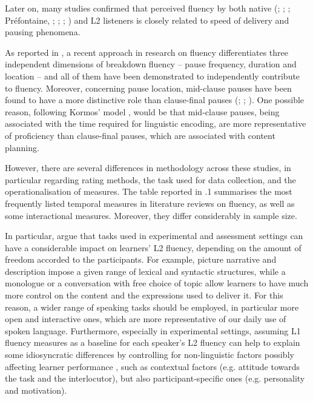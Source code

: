 Later on, many studies confirmed that perceived fluency by both native (\citealt{BoskerEtAl2013}; \citealt{DerwingEtAl2004}; \citealt{KormosDénes2004}; Préfontaine, \citealt{KormosJohnson2016}; \citealt{Rossiter2009}; \citealt{SaitoEtAl2018}; \citealt{SuzukiKormos2020}) and L2 listeners \citep{MagneEtAl2019} is closely related to speed of delivery and pausing phenomena.

As reported in \citet{SuzukiKormos2020}, a recent approach in research on fluency differentiates three independent dimensions of breakdown fluency – pause frequency, duration and location – and all of them have been demonstrated to independently contribute to fluency. Moreover, concerning pause location, mid-clause pauses have been found to have a more distinctive role than clause-final pauses (\citealt{MagneEtAl2019}; \citealt{SaitoEtAl2018}; \citealt{SuzukiKormos2020}). One possible reason, following Kormos’ model \citep{Kormos2006}, would be that mid-clause pauses, being associated with the time required for linguistic encoding, are more representative of proficiency than clause-final pauses, which are associated with content planning.

However, there are several differences in methodology across these studies, in particular regarding rating methods, the task used for data collection, and the operationalisation of measures. The table reported in .1 summarises the most frequently listed temporal measures in literature reviews on fluency, as well as some interactional measures. Moreover, they differ considerably in sample size.

In particular, \citet{DerwingEtAl2004} argue that tasks used in experimental and assessment settings can have a considerable impact on learners’ L2 fluency, depending on the amount of freedom accorded to the participants. For example, picture narrative and description impose a given range of lexical and syntactic structures, while a monologue or a conversation with free choice of topic allow learners to have much more control on the content and the expressions used to deliver it. For this reason, a wider range of speaking tasks should be employed, in particular more open and interactive ones, which are more representative of our daily use of spoken language. Furthermore, especially in experimental settings, assuming L1 fluency measures as a baseline for each speaker’s L2 fluency can help to explain some idiosyncratic differences by controlling for non-linguistic factors possibly affecting learner performance \citep{Segalowitz2016}, such as contextual factors (e.g. attitude towards the task and the interlocutor), but also participant-specific ones (e.g. personality and motivation).

